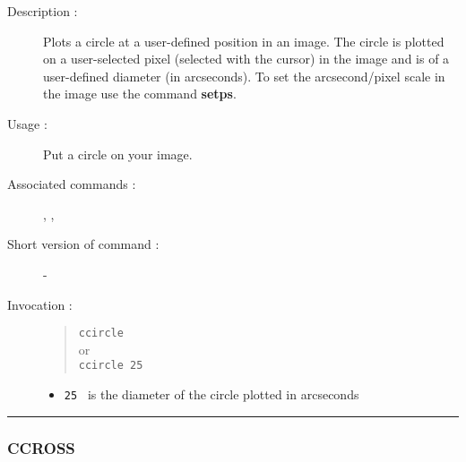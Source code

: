 \begin{description}

\item[Description :] Plots a circle at a user-defined position in an image.
The circle is plotted on a user-selected pixel (selected with the cursor) in
the image and is of a user-defined diameter (in arcseconds).  To set the
arcsecond/pixel scale in the image use the command {\bf setps}.

\item[Usage :] Put a circle on your image.
\item[Associated commands :] {\tt {}},
{\tt {}}, {\tt {}}
\item[Short version of command :] -
\item[Invocation :]

\begin{quote}{\tt  ccircle }\\
or \\
{\tt ccircle 25 }
\end{quote}

\begin{itemize}

\item {\tt 25 } is the diameter of the circle plotted in arcseconds

\end{itemize}

\end{description}

\hrule
\subsubsection*{\label{CCROSS}CCROSS}

